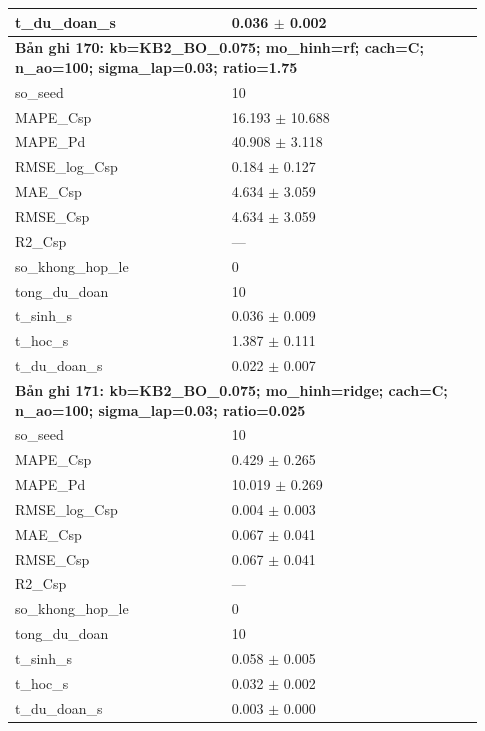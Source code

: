 \begin{longtable}{p{0.43\linewidth}p{0.50\linewidth}}
t\_\allowbreak du\_\allowbreak doan\_\allowbreak s & 0.036 $\pm$ 0.002 \\
\midrule
\multicolumn{2}{p{0.95\linewidth}}{\textbf{Bản ghi 170: kb=KB2\_BO\_0.075; mo\_hinh=rf; cach=C; n\_ao=100; sigma\_lap=0.03; ratio=1.75}} \\
so\_\allowbreak seed & 10 \\
MAPE\_\allowbreak Csp & 16.193 $\pm$ 10.688 \\
MAPE\_\allowbreak Pd & 40.908 $\pm$ 3.118 \\
RMSE\_\allowbreak log\_\allowbreak Csp & 0.184 $\pm$ 0.127 \\
MAE\_\allowbreak Csp & 4.634 $\pm$ 3.059 \\
RMSE\_\allowbreak Csp & 4.634 $\pm$ 3.059 \\
R2\_\allowbreak Csp & — \\
so\_\allowbreak khong\_\allowbreak hop\_\allowbreak le & 0 \\
tong\_\allowbreak du\_\allowbreak doan & 10 \\
t\_\allowbreak sinh\_\allowbreak s & 0.036 $\pm$ 0.009 \\
t\_\allowbreak hoc\_\allowbreak s & 1.387 $\pm$ 0.111 \\
t\_\allowbreak du\_\allowbreak doan\_\allowbreak s & 0.022 $\pm$ 0.007 \\
\midrule
\multicolumn{2}{p{0.95\linewidth}}{\textbf{Bản ghi 171: kb=KB2\_BO\_0.075; mo\_hinh=ridge; cach=C; n\_ao=100; sigma\_lap=0.03; ratio=0.025}} \\
so\_\allowbreak seed & 10 \\
MAPE\_\allowbreak Csp & 0.429 $\pm$ 0.265 \\
MAPE\_\allowbreak Pd & 10.019 $\pm$ 0.269 \\
RMSE\_\allowbreak log\_\allowbreak Csp & 0.004 $\pm$ 0.003 \\
MAE\_\allowbreak Csp & 0.067 $\pm$ 0.041 \\
RMSE\_\allowbreak Csp & 0.067 $\pm$ 0.041 \\
R2\_\allowbreak Csp & — \\
so\_\allowbreak khong\_\allowbreak hop\_\allowbreak le & 0 \\
tong\_\allowbreak du\_\allowbreak doan & 10 \\
t\_\allowbreak sinh\_\allowbreak s & 0.058 $\pm$ 0.005 \\
t\_\allowbreak hoc\_\allowbreak s & 0.032 $\pm$ 0.002 \\
t\_\allowbreak du\_\allowbreak doan\_\allowbreak s & 0.003 $\pm$ 0.000 \\

\end{longtable}
